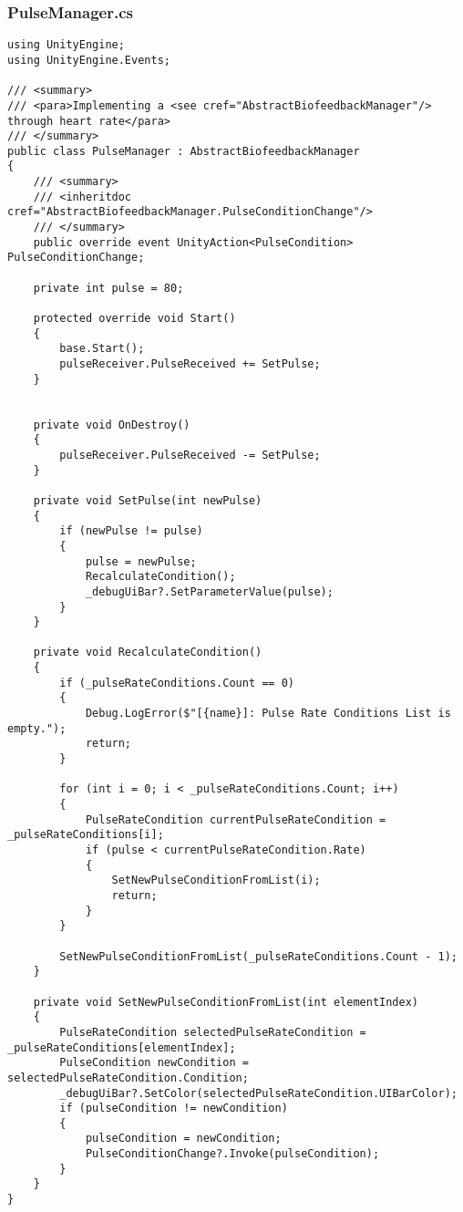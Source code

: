 \subsubsection*{PulseManager.cs}
\begin{verbatim}
using UnityEngine;
using UnityEngine.Events;

/// <summary>
/// <para>Implementing a <see cref="AbstractBiofeedbackManager"/> through heart rate</para>
/// </summary>
public class PulseManager : AbstractBiofeedbackManager
{
    /// <summary>
    /// <inheritdoc cref="AbstractBiofeedbackManager.PulseConditionChange"/>
    /// </summary>
    public override event UnityAction<PulseCondition> PulseConditionChange;
    
    private int pulse = 80;

    protected override void Start()
    {
        base.Start();
        pulseReceiver.PulseReceived += SetPulse;
    }


    private void OnDestroy()
    {
        pulseReceiver.PulseReceived -= SetPulse;
    }

    private void SetPulse(int newPulse)
    {
        if (newPulse != pulse)
        {
            pulse = newPulse;
            RecalculateCondition();
            _debugUiBar?.SetParameterValue(pulse);
        }
    }

    private void RecalculateCondition()
    {
        if (_pulseRateConditions.Count == 0)
        {
            Debug.LogError($"[{name}]: Pulse Rate Conditions List is empty.");
            return;
        }

        for (int i = 0; i < _pulseRateConditions.Count; i++)
        {
            PulseRateCondition currentPulseRateCondition = _pulseRateConditions[i];
            if (pulse < currentPulseRateCondition.Rate)
            {
                SetNewPulseConditionFromList(i);
                return;
            }
        }

        SetNewPulseConditionFromList(_pulseRateConditions.Count - 1);
    }

    private void SetNewPulseConditionFromList(int elementIndex)
    {
        PulseRateCondition selectedPulseRateCondition = _pulseRateConditions[elementIndex];
        PulseCondition newCondition = selectedPulseRateCondition.Condition;
        _debugUiBar?.SetColor(selectedPulseRateCondition.UIBarColor);
        if (pulseCondition != newCondition)
        {
            pulseCondition = newCondition;
            PulseConditionChange?.Invoke(pulseCondition);
        }
    }
}
\end{verbatim}
